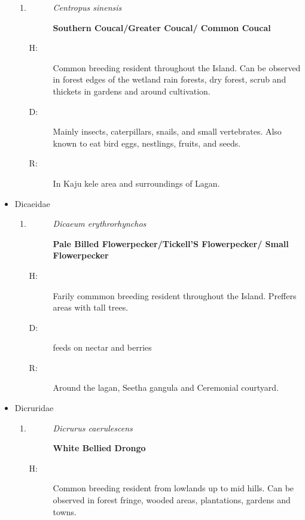 \begin{itemize}
\begin{enumerate}
\item%
\begin{description}%
\item[]%
\textit{Centropus sinensis}%
\item[]%
\textbf{Southern Coucal/Greater Coucal/ Common Coucal}%
\end{description}%
\begin{description}%
\item[H: ]%
Common breeding resident throughout the Island. Can be observed in forest edges of the wetland rain forests, dry forest, scrub and thickets in gardens and around cultivation.%
\item[D: ]%
Mainly  insects, caterpillars, snails, and small vertebrates. Also known to eat bird eggs, nestlings, fruits, and seeds.%
\item[R: ]%
In Kaju kele area and surroundings of Lagan.%
\end{description}%
\end{enumerate}%
\item%
Dicaeidae%
\begin{enumerate}%
\item%
\begin{description}%
\item[]%
\textit{Dicaeum erythrorhynchos}%
\item[]%
\textbf{Pale Billed Flowerpecker/Tickell'S Flowerpecker/ Small Flowerpecker}%
\end{description}%
\begin{description}%
\item[H: ]%
Farily commmon breeding resident throughout the Island. Preffers areas with tall trees.%
\item[D: ]%
 feeds on nectar and berries%
\item[R: ]%
Around the lagan, Seetha gangula and Ceremonial courtyard.%
\end{description}%
\end{enumerate}%
\item%
Dicruridae%
\begin{enumerate}%
\item%
\begin{description}%
\item[]%
\textit{Dicrurus caerulescens}%
\item[]%
\textbf{White Bellied Drongo}%
\end{description}%
\begin{description}%
\item[H: ]%
Common breeding resident from lowlands up to mid hills. Can be observed in forest fringe, wooded areas, plantations, gardens and towns.%

\end{description}
\end{enumerate}
\end{itemize}
